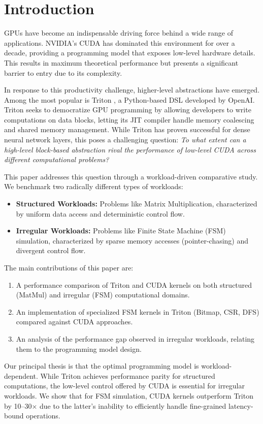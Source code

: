 \section{Introduction}\label{sec:intro}

GPUs have become an indispensable driving force behind a wide range of applications. NVIDIA's CUDA \cite{cuda} has dominated this environment for over a decade, providing a programming model that exposes low-level hardware details. This results in maximum theoretical performance but presents a significant barrier to entry due to its complexity.

In response to this productivity challenge, higher-level abstractions have emerged. Among the most popular is Triton \cite{triton}, a Python-based DSL developed by OpenAI. Triton seeks to democratize GPU programming by allowing developers to write computations on data blocks, letting its JIT compiler handle memory coalescing and shared memory management.
While Triton has proven successful for dense neural network layers, this poses a challenging question: \textit{To what extent can a high-level block-based abstraction rival the performance of low-level CUDA across different computational problems?}

This paper addresses this question through a workload-driven comparative study. We benchmark two radically different types of workloads:
\begin{itemize}
    \item \textbf{Structured Workloads:} Problems like Matrix Multiplication, characterized by uniform data access and deterministic control flow.
    \item \textbf{Irregular Workloads:} Problems like Finite State Machine (FSM) simulation, characterized by sparse memory accesses (pointer-chasing) and divergent control flow.
\end{itemize}

The main contributions of this paper are:
\begin{enumerate}
    \item A performance comparison of Triton and CUDA kernels on both structured (MatMul) and irregular (FSM) computational domains.
    \item An implementation of specialized FSM kernels in Triton (Bitmap, CSR, DFS) compared against CUDA approaches.
    \item An analysis of the performance gap observed in irregular workloads, relating them to the programming model design.
\end{enumerate}

Our principal thesis is that the optimal programming model is workload-dependent. While Triton achieves performance parity for structured computations, the low-level control offered by CUDA is essential for irregular workloads. We show that for FSM simulation, CUDA kernels outperform Triton by 10--30$\times$ due to the latter's inability to efficiently handle fine-grained latency-bound operations.
